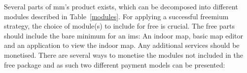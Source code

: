 Several parts of \gls{mm}'s product exists, which can be decomposed into different modules described in Table~\ref{modules}. For applying a successful freemium strategy, the choice of module(s) to include for free is crucial. The free parts should include the bare minimum for an \gls{ims}: An indoor map, basic map editor and an application to view the indoor map. Any additional services should be monetised. There are several ways to monetise the modules not included in the free package and as such two different payment models can be presented:


\begin{table}[]
\centering
\caption{Proposed modularisation of MazeMap}
\label{modules}
\end{table}


